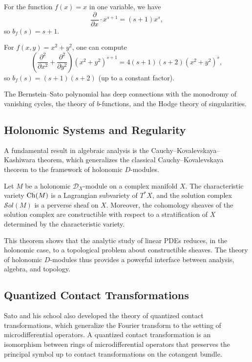 \begin{example}
For the function \(f(x) = x\) in one variable, we have
\[
\frac{\partial}{\partial x} \cdot x^{s+1} = (s+1) x^s,
\]
so \(b_f(s) = s+1\).

For \(f(x,y) = x^2 + y^2\), one can compute
\[
\left(\frac{\partial^2}{\partial x^2} + \frac{\partial^2}{\partial y^2}\right) (x^2 + y^2)^{s+1} = 4(s+1)(s+2)(x^2 + y^2)^s,
\]
so \(b_f(s) = (s+1)(s+2)\) (up to a constant factor).
\end{example}

The Bernstein--Sato polynomial has deep connections with the monodromy of vanishing cycles, the theory of \(b\)-functions, and the Hodge theory of singularities.

\subsection{Holonomic Systems and Regularity}

A fundamental result in algebraic analysis is the Cauchy--Kovalevskaya--Kashiwara theorem, which generalizes the classical Cauchy--Kovalevskaya theorem to the framework of holonomic \(D\)-modules.

\begin{theorem}
Let \(M\) be a holonomic \(\mathcal{D}_X\)-module on a complex manifold \(X\). The characteristic variety \(\operatorname{Ch}(M)\) is a Lagrangian subvariety of \(T^*X\), and the solution complex \(\mathcal{S}ol(M)\) is a perverse sheaf on \(X\). Moreover, the cohomology sheaves of the solution complex are constructible with respect to a stratification of \(X\) determined by the characteristic variety.
\end{theorem}

This theorem shows that the analytic study of linear PDEs reduces, in the holonomic case, to a topological problem about constructible sheaves. The theory of holonomic \(D\)-modules thus provides a powerful interface between analysis, algebra, and topology.

\subsection{Quantized Contact Transformations}

Sato and his school also developed the theory of quantized contact transformations, which generalize the Fourier transform to the setting of microdifferential operators. A quantized contact transformation is an isomorphism between rings of microdifferential operators that preserves the principal symbol up to contact transformations on the cotangent bundle.

